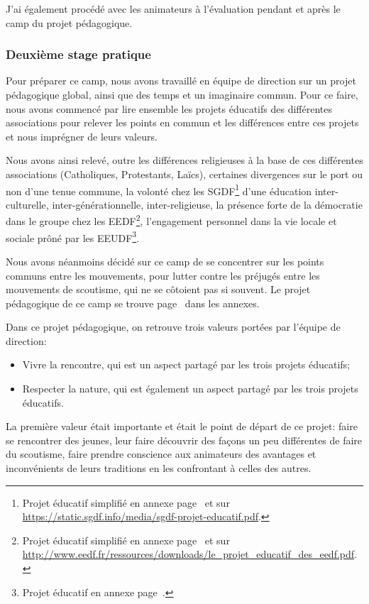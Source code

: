 \documentclass[titlepage,11pt,a4paper]{article}
\begin{document}
J'ai également procédé avec les animateurs à l'évaluation pendant et après le camp du
projet pédagogique.

\subsubsection{Deuxième stage pratique}

Pour préparer ce camp, nous avons travaillé en équipe de direction sur un projet
pédagogique global, ainsi que des temps et un imaginaire commun. Pour ce faire, nous avons
commencé par lire ensemble les projets éducatifs des différentes associations pour relever
les points en commun et les différences entre ces projets et nous imprégner de leurs
valeurs.

Nous avons ainsi relevé, outre les différences religieuses à la base de ces différentes
associations (Catholiques, Protestants, Laïcs), certaines divergences sur
le port ou non d'une tenue commune, la volonté chez les SGDF\footnote{Projet éducatif simplifié en
annexe page~\pageref{pesgdf} et sur \url{https://static.sgdf.info/media/sgdf-projet-educatif.pdf}.}
d'une éducation inter-culturelle, inter-générationnelle, inter-religieuse, la présence forte de la
démocratie dans le groupe chez les EEDF\footnote{Projet éducatif simplifié en annexe page~\pageref{peeedf} et sur
\url{http://www.eedf.fr/ressources/downloads/le_projet_educatif_des_eedf.pdf}.}, l'engagement personnel dans la vie locale et
sociale prôné par les EEUDF\footnote{Projet éducatif en annexe page~\pageref{peeeudf}.}.

Nous avons néanmoins décidé sur ce camp de se concentrer sur les points communs entre les
mouvements, pour lutter contre les préjugés entre les mouvements de scoutisme, qui ne se
côtoient pas si souvent. Le projet pédagogique de ce camp se trouve page~\pageref{projped}
dans les annexes.

Dans ce projet pédagogique, on retrouve trois valeurs portées par l'équipe de direction:

\begin{itemize}
   \item Vivre la rencontre, qui est un aspect partagé par les trois projets éducatifs;
   \item Respecter la nature, qui est également un aspect partagé par les trois projets
      éducatifs.
\end{itemize}

La première valeur était importante et était le point de départ de ce projet: faire se
rencontrer des jeunes, leur faire découvrir des façons un peu différentes de faire du
scoutisme, faire prendre conscience aux animateurs des avantages et inconvénients de leurs
traditions en les confrontant à celles des autres.
\end{document}
